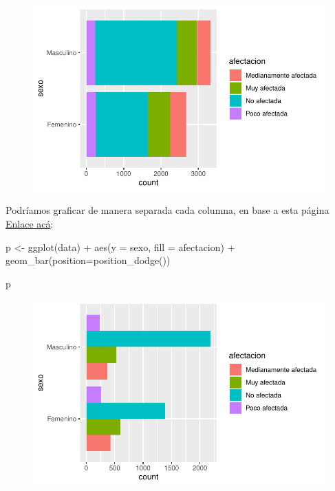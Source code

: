 \documentclass[
  letterpaper,
  DIV=11,
  numbers=noendperiod]{scrartcl}
\newenvironment{Shaded}{\begin{snugshade}}{\end{snugshade}}
\newcommand{\AttributeTok}[1]{\textcolor[rgb]{0.40,0.45,0.13}{#1}}
\newcommand{\FunctionTok}[1]{\textcolor[rgb]{0.28,0.35,0.67}{#1}}
\newcommand{\NormalTok}[1]{\textcolor[rgb]{0.00,0.23,0.31}{#1}}
\newcommand{\OtherTok}[1]{\textcolor[rgb]{0.00,0.23,0.31}{#1}}
\newcommand{\SpecialCharTok}[1]{\textcolor[rgb]{0.37,0.37,0.37}{#1}}
\begin{document}
\begin{figure}[H]

{\centering \includegraphics{notebook_visualization_files/figure-pdf/unnamed-chunk-4-1.pdf}

}

\end{figure}

Podríamos graficar de manera separada cada columna, en base a esta
página
\href{http://www.sthda.com/english/wiki/ggplot2-barplots-quick-start-guide-r-software-and-data-visualization}{Enlace acá}:

\begin{Shaded}
\begin{Highlighting}[]
\NormalTok{p }\OtherTok{\textless{}{-}} \FunctionTok{ggplot}\NormalTok{(data) }\SpecialCharTok{+} \FunctionTok{aes}\NormalTok{(}\AttributeTok{y =}\NormalTok{ sexo, }\AttributeTok{fill =}\NormalTok{ afectacion) }\SpecialCharTok{+} 
  \FunctionTok{geom\_bar}\NormalTok{(}\AttributeTok{position=}\FunctionTok{position\_dodge}\NormalTok{())}

\NormalTok{p}
\end{Highlighting}
\end{Shaded}

\begin{figure}[H]

{\centering \includegraphics{notebook_visualization_files/figure-pdf/unnamed-chunk-5-1.pdf}

}

\end{figure}
\end{document}
